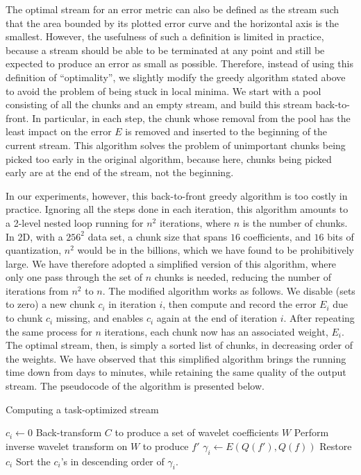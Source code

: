 The optimal stream for an error metric can also be defined as the stream such that the area bounded
by its plotted error curve and the horizontal axis is the smallest. However, the usefulness of such
a definition is limited in practice, because a stream should be able to be terminated at any point
and still be expected to produce an error as small as possible. Therefore, instead of using this
definition of ``optimality'', we slightly modify the greedy algorithm stated above to avoid the
problem of being stuck in local minima. We start with a pool consisting of all the chunks and an
empty stream, and build this stream back-to-front. In particular, in each step, the chunk whose
removal from the pool has the least impact on the error $E$ is removed and inserted to the beginning
of the current stream. This algorithm solves the problem of unimportant chunks being picked too
early in the original algorithm, because here, chunks being picked early are at the end of the
stream, not the beginning.

In our experiments, however, this back-to-front greedy algorithm is too costly in practice. Ignoring
all the steps done in each iteration, this algorithm amounts to a 2-level nested loop running for
$n^2$ iterations, where $n$ is the number of chunks. In 2D, with a $256^2$ data set, a chunk size
that spans $16$ coefficients, and $16$ bits of quantization, $n^2$ would be in the billions, which
we have found to be prohibitively large. We have therefore adopted a simplified version of this
algorithm, where only one pass through the set of $n$ chunks is needed, reducing the number of
iterations from $n^2$ to $n$. The modified algorithm works as follows. We disable (sets to zero) a
new chunk $c_i$ in iteration $i$, then compute and record the error $E_i$ due to chunk $c_i$
missing, and enables $c_i$ again at the end of iteration $i$. After repeating the same process for
$n$ iterations, each chunk now has an associated weight, $E_i$. The optimal stream, then, is simply
a sorted list of chunks, in decreasing order of the weights. We have observed that this simplified
algorithm brings the running time down from days to minutes, while retaining the same quality of the
output stream. The pseudocode of the algorithm is presented below.

\begin{algorithm}[h]
  \caption{Computing a task-optimized stream}
  \begin{algorithmic}[1]
			\State $c_i \gets 0$
      \State Back-transform $C$ to produce a set of wavelet coefficients $W$
			\State Perform inverse wavelet transform on $W$ to produce $f'$
			\State $\gamma_i \gets E(Q(f'),Q(f))$			
			\State Restore $c_i$
		\EndFor
		\State Sort the $c_i$'s in descending order of $\gamma_i$.
	\end{algorithmic}
	\label{alg:greedy}
\end{algorithm}
